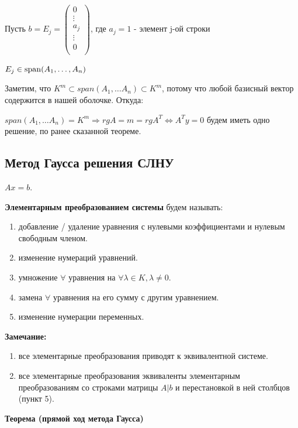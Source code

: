           Пусть \(b = E_j = \begin{pmatrix}
              0 \\ \vdots\\a_j\\ \vdots\\ 0 \\
          \end{pmatrix}\), где \(a_j = 1\) - элемент j-ой строки

          \(E_j \in \operatorname{span}(A_1,\ldots, A_n)\)

          Заметим, что \(K^m \subset span(A_1,\ldots A_n) \subset K^m\), потому что любой базисный вектор  содержится в нашей оболочке. Откуда:

          \(span(A_1,\ldots A_n)  = K^m \Rightarrow rg A = m = rg A^T \Leftrightarrow A^Ty=0\) будем иметь одно решение, по ранее сказанной теореме.


\subsection{Метод Гаусса решения СЛНУ}

\(Ax=b\).

\textbf{Элементарным преобразованием системы} будем называть:

\begin{enumerate}
    \item добавление / удаление уравнения с нулевыми коэффициентами и нулевым свободным членом.
    \item изменение нумераций уравнений.
    \item умножение \(\forall\) уравнения на \(\forall \lambda \in K, \lambda \neq 0\).
    \item замена \(\forall\) уравнения на его сумму с другим уравнением.
    \item изменение нумерации переменных.
\end{enumerate}

\textbf{Замечание:}
\begin{enumerate}
    \item все элементарные преобразования приводят к эквивалентной системе.
    \item все элементарные преобразования эквиваленты элементарным преобразованиям со строками матрицы \(A | b\) и перестановкой в ней столбцов (пункт 5).
\end{enumerate}

\textbf{Теорема (прямой ход метода Гаусса)}

